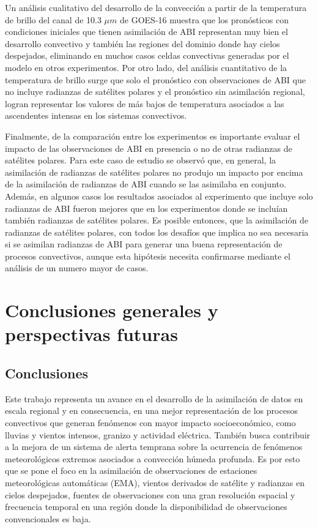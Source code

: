 \documentclass[12pt,oneside,a4paper]{reedthesis}
\begin{document}
Un análisis cualitativo del desarrollo de la convección a partir de la temperatura de brillo del canal de 10.3 \(\mu m\) de GOES-16 muestra que los pronósticos con condiciones iniciales que tienen asimilación de ABI representan muy bien el desarrollo convectivo y también las regiones del dominio donde hay cielos despejados, eliminando en muchos casos celdas convectivas generadas por el modelo en otros experimentos. Por otro lado, del análisis cuantitativo de la temperatura de brillo surge que solo el pronóstico con observaciones de ABI que no incluye radianzas de satélites polares y el pronóstico sin asimilación regional, logran representar los valores de más bajos de temperatura asociados a las ascendentes intensas en los sistemas convectivos.

Finalmente, de la comparación entre los experimentos es importante evaluar el impacto de las observaciones de ABI en presencia o no de otras radianzas de satélites polares. Para este caso de estudio se observó que, en general, la asimilación de radianzas de satélites polares no produjo un impacto por encima de la asimilación de radianzas de ABI cuando se las asimilaba en conjunto. Además, en algunos casos los resultados asociados al experimento que incluye solo radianzas de ABI fueron mejores que en los experimentos donde se incluían también radianzas de satélites polares. Es posible entonces, que la asimilación de radianzas de satélites polares, con todos los desafíos que implica no sea necesaria si se asimilan radianzas de ABI para generar una buena representación de procesos convectivos, aunque esta hipótesis necesita confirmarse mediante el análisis de un numero mayor de casos.

\hypertarget{conclusiones-generales-y-perspectivas-futuras}{%
\chapter{Conclusiones generales y perspectivas futuras}\label{conclusiones-generales-y-perspectivas-futuras}}

\hypertarget{conclusiones-3}{%
\section{Conclusiones}\label{conclusiones-3}}

Este trabajo representa un avance en el desarrollo de la asimilación de datos en escala regional y en consecuencia, en una mejor representación de los procesos convectivos que generan fenómenos con mayor impacto socioeconómico, como lluvias y vientos intensos, granizo y actividad eléctrica. También busca contribuir a la mejora de un sistema de alerta temprana sobre la ocurrencia de fenómenos meteorológicos extremos asociados a convección húmeda profunda. Es por esto que se pone el foco en la asimilación de observaciones de estaciones meteorológicas automáticas (EMA), vientos derivados de satélite y radianzas en cielos despejados, fuentes de observaciones con una gran resolución espacial y frecuencia temporal en una región donde la disponibilidad de observaciones convencionales es baja.
\end{document}
